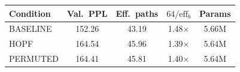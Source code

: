 \begin{tabular}{lcccc}
\toprule
Condition & Val.\ PPL & Eff.\ paths & $64/\mathrm{eff}_b$ & Params \\
\midrule
BASELINE & 152.26 & 43.19 & 1.48$\times$ & 5.66M \\
HOPF & 164.54 & 45.96 & 1.39$\times$ & 5.64M \\
PERMUTED & 164.41 & 45.81 & 1.40$\times$ & 5.64M \\
\bottomrule
\end{tabular}
